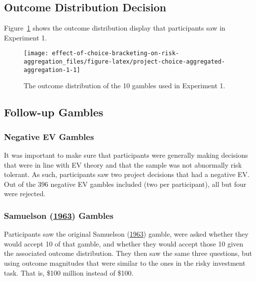 \documentclass[
  english,
  man, donotrepeattitle,floatsintext]{apa7}
\theoremstyle{definition}
\theoremstyle{definition}
\theoremstyle{definition}
\theoremstyle{definition}
\theoremstyle{remark}
\begin{document}
\hypertarget{outcome-distribution-decision}{%
\subsection{Outcome Distribution Decision}\label{outcome-distribution-decision}}

Figure~\ref{fig:project-choice-aggregated-aggregation-1} shows the outcome
distribution display that participants saw in Experiment 1.



\begin{figure}
\texttt{[image: effect-of-choice-bracketing-on-risk-aggregation\_files/figure-latex/project-choice-aggregated-aggregation-1-1]} \caption{The outcome distribution of the 10 gambles used in Experiment 1.}\label{fig:project-choice-aggregated-aggregation-1}
\end{figure}

\hypertarget{follow-up-materials-aggregation-1-appendix}{%
\subsection{Follow-up Gambles}\label{follow-up-materials-aggregation-1-appendix}}

\hypertarget{negative-ev-gambles}{%
\subsubsection{Negative EV Gambles}\label{negative-ev-gambles}}

It was important to make sure that participants were generally making decisions
that were in line with EV theory and that the sample was not abnormally risk
tolerant. As such, participants saw two project decisions that had a negative
EV. Out of the 396 negative EV gambles
included (two per participant), all but four
were rejected.

\hypertarget{samuelson1963-gambles}{%
\subsubsection{\texorpdfstring{Samuelson (\protect\hyperlink{ref-samuelson1963}{1963}) Gambles}{Samuelson (1963) Gambles}}\label{samuelson1963-gambles}}

Participants saw the original Samuelson (\protect\hyperlink{ref-samuelson1963}{1963}) gamble, were asked whether they
would accept 10 of that gamble, and whether they would accept those 10 given the
associated outcome distribution. They then saw the same three questions, but
using outcome magnitudes that were similar to the ones in the risky investment
task. That is, \$100 million instead of \$100.
\end{document}
